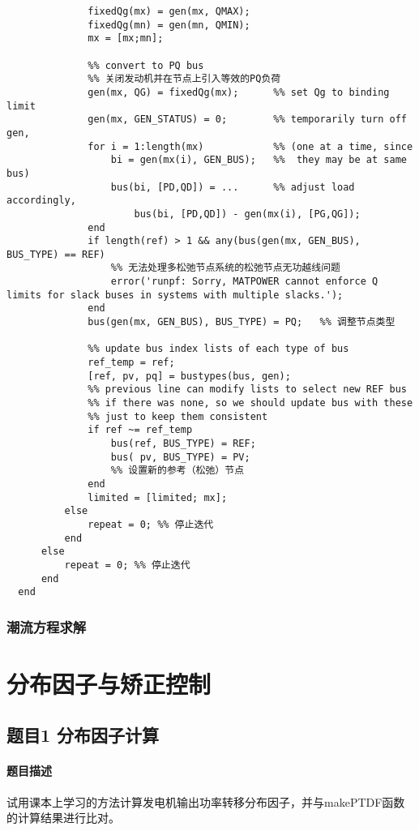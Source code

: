 \documentclass[a4paper,12pt]{article}
\begin{document}
\begin{enumerate}
\begin{lstlisting}[style=Matlab-editor,basicstyle=\mlttfamily]
              %% save corresponding limit values
              fixedQg(mx) = gen(mx, QMAX);
              fixedQg(mn) = gen(mn, QMIN);
              mx = [mx;mn];

              %% convert to PQ bus
              %% 关闭发动机并在节点上引入等效的PQ负荷
              gen(mx, QG) = fixedQg(mx);      %% set Qg to binding limit
              gen(mx, GEN_STATUS) = 0;        %% temporarily turn off gen,
              for i = 1:length(mx)            %% (one at a time, since
                  bi = gen(mx(i), GEN_BUS);   %%  they may be at same bus)
                  bus(bi, [PD,QD]) = ...      %% adjust load accordingly,
                      bus(bi, [PD,QD]) - gen(mx(i), [PG,QG]);
              end
              if length(ref) > 1 && any(bus(gen(mx, GEN_BUS), BUS_TYPE) == REF)
                  %% 无法处理多松弛节点系统的松弛节点无功越线问题
                  error('runpf: Sorry, MATPOWER cannot enforce Q limits for slack buses in systems with multiple slacks.');
              end
              bus(gen(mx, GEN_BUS), BUS_TYPE) = PQ;   %% 调整节点类型

              %% update bus index lists of each type of bus
              ref_temp = ref;
              [ref, pv, pq] = bustypes(bus, gen);
              %% previous line can modify lists to select new REF bus
              %% if there was none, so we should update bus with these
              %% just to keep them consistent
              if ref ~= ref_temp
                  bus(ref, BUS_TYPE) = REF;
                  bus( pv, BUS_TYPE) = PV;
                  %% 设置新的参考（松弛）节点
              end
              limited = [limited; mx];
          else
              repeat = 0; %% 停止迭代
          end
      else
          repeat = 0; %% 停止迭代
      end
  end
      \end{lstlisting}
    \end{enumerate}
    \subsubsection{潮流方程求解}


    \section{分布因子与矫正控制}
    \subsection{题目1 分布因子计算}
    \paragraph{题目描述} 试用课本上学习的方法计算发电机输出功率转移分布因子，并与makePTDF函数的计算结果进行比对。
\end{document}
